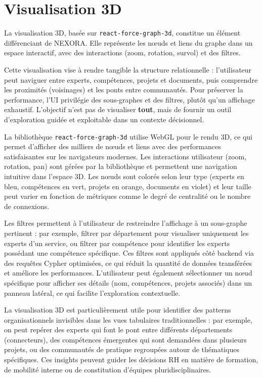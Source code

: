 \documentclass[12pt,a4paper]{report}
\begin{document}
\section{Visualisation 3D}
La visualisation 3D, basée sur \texttt{react-force-graph-3d}, constitue un élément différenciant de NEXORA. Elle représente les nœuds et liens du graphe dans un espace interactif, avec des interactions (zoom, rotation, survol) et des filtres.

Cette visualisation vise à rendre tangible la structure relationnelle : l'utilisateur peut naviguer entre experts, compétences, projets et documents, puis comprendre les proximités (voisinages) et les ponts entre communautés. Pour préserver la performance, l'UI privilégie des sous-graphes et des filtres, plutôt qu'un affichage exhaustif. L'objectif n'est pas de visualiser \textbf{tout}, mais de fournir un outil d'exploration guidée et exploitable dans un contexte décisionnel.

La bibliothèque \texttt{react-force-graph-3d} utilise WebGL pour le rendu 3D, ce qui permet d'afficher des milliers de nœuds et liens avec des performances satisfaisantes sur les navigateurs modernes. Les interactions utilisateur (zoom, rotation, pan) sont gérées par la bibliothèque et permettent une navigation intuitive dans l'espace 3D. Les nœuds sont colorés selon leur type (experts en bleu, compétences en vert, projets en orange, documents en violet) et leur taille peut varier en fonction de métriques comme le degré de centralité ou le nombre de connexions.

Les filtres permettent à l'utilisateur de restreindre l'affichage à un sous-graphe pertinent : par exemple, filtrer par département pour visualiser uniquement les experts d'un service, ou filtrer par compétence pour identifier les experts possédant une compétence spécifique. Ces filtres sont appliqués côté backend via des requêtes Cypher optimisées, ce qui réduit la quantité de données transférées et améliore les performances. L'utilisateur peut également sélectionner un nœud spécifique pour afficher ses détails (nom, compétences, projets associés) dans un panneau latéral, ce qui facilite l'exploration contextuelle.

La visualisation 3D est particulièrement utile pour identifier des patterns organisationnels invisibles dans les vues tabulaires traditionnelles : par exemple, on peut repérer des experts qui font le pont entre différents départements (connecteurs), des compétences émergentes qui sont demandées dans plusieurs projets, ou des communautés de pratique regroupées autour de thématiques spécifiques. Ces insights peuvent guider les décisions RH en matière de formation, de mobilité interne ou de constitution d'équipes pluridisciplinaires.
\end{document}
